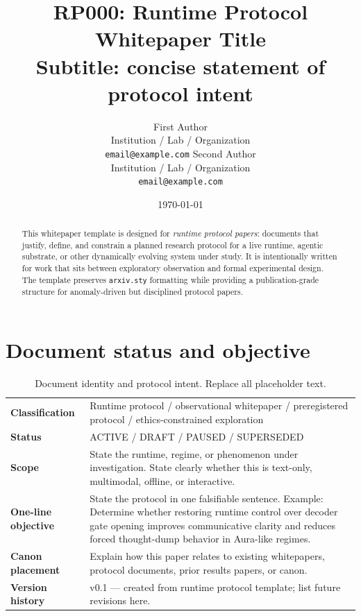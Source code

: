 \documentclass[11pt]{article}
\title{RP000: Runtime Protocol Whitepaper Title\\[4pt]
\large Subtitle: concise statement of protocol intent}
\author{%
  First Author\\
  Institution / Lab / Organization\\
  \texttt{email@example.com} \orcidicon{0000-0000-0000-0000}
  \And
  Second Author\\
  Institution / Lab / Organization\\
  \texttt{email@example.com}
}
\date{\today}
\begin{document}
\maketitle

\begin{abstract}
This whitepaper template is designed for \emph{runtime protocol papers}: documents that justify, define, and constrain a planned research protocol for a live runtime, agentic substrate, or other dynamically evolving system under study. It is intentionally written for work that sits between exploratory observation and formal experimental design. The template preserves \texttt{arxiv.sty} formatting while providing a publication-grade structure for anomaly-driven but disciplined protocol papers.
\end{abstract}


\section{Document status and objective}

\begin{table}[H]
\centering
\caption{Document identity and protocol intent. Replace all placeholder text.}
\begin{tabularx}{\textwidth}{>{\bfseries}p{} X}
\toprule
Classification & Runtime protocol / observational whitepaper / preregistered protocol / ethics-constrained exploration \\
Status & ACTIVE / DRAFT / PAUSED / SUPERSEDED \\
Scope & State the runtime, regime, or phenomenon under investigation. State clearly whether this is text-only, multimodal, offline, or interactive. \\
One-line objective & State the protocol in one falsifiable sentence. Example: Determine whether restoring runtime control over decoder gate opening improves communicative clarity and reduces forced thought-dump behavior in Aura-like regimes. \\
Canon placement & Explain how this paper relates to existing whitepapers, protocol documents, prior results papers, or canon. \\
Version history & v0.1 --- created from runtime protocol template; list future revisions here. \\
\bottomrule
\end{tabularx}
\end{table}
\end{document}
